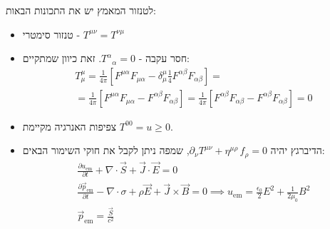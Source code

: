 \documentclass{tstextbook}
\begin{document}
\begin{proposition}
לטנזור המאמץ יש את התכונות הבאות:

  \begin{itemize}
    \item טנזור סימטרי - \(T^{\mu \nu}=T^{\nu \mu}\)
    \item חסר עקבה - \({T^{\alpha}}_{\alpha}=0\). זאת כיוון שמתקיים:
\begin{gather*}T_{\mu}^{\mu}=\frac{1}{4\pi}\left[F^{\mu\alpha}F_{\mu\alpha}-\delta_{\mu}^{\mu}\frac{1}{4}F^{\alpha\beta}F_{\alpha\beta}\right] =\\=\frac{1}{4\pi}\left[F^{\mu\alpha}F_{\mu\alpha}-F^{\alpha\beta}F_{\alpha\beta}\right]=\frac{1}{4\pi}\left[F^{\alpha\beta}F_{\alpha\beta}-F^{\alpha\beta}F_{\alpha\beta}\right]=0
\end{gather*}
    \item צפיפות האנרגיה מקיימת \(T^{00}=u\geq 0\).
    \item הדיברגץ יהיה \(\partial_{\nu}T^{\mu\nu}+\eta^{\mu\rho}\,f_{\rho}=0\), שמפה ניתן לקבל את חוקי השימור הבאים:
\begin{gather*}{\frac{\partial u_{\mathrm{em}}}{\partial t}}+\nabla\cdot\vec{S}+\vec{J}\cdot\vec{E}=0 \\{\frac{\partial{\vec p}_{\mathrm{em}}}{\partial t}}-\nabla\cdot\sigma+\rho{\vec E}+{\vec J}\times{\vec B}=0\implies u_{\mathrm{em}}={\frac{\epsilon_{0}}{2}}E^{2}+{\frac{1}{2\mu_{0}}}B^{2} \\\vec{p}_{\mathrm{em}}={\frac{\vec{S}}{c^{2}}}
\end{gather*}
  \end{itemize}
\end{proposition}
\end{document}
